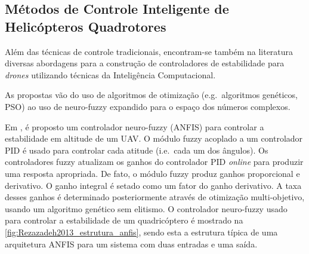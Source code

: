 \subsection{Métodos de Controle Inteligente de Helicópteros Quadrotores}
\label{sec:trab-rel-quadrotores-sub-ia}

Além das técnicas de controle tradicionais, encontram-se também na literatura diversas abordagens para a construção de controladores de estabilidade para \textit{drones} utilizando técnicas da Inteligência Computacional. 

As propostas vão do uso de algoritmos de otimização (e.g.\ algoritmos genéticos, PSO) ao uso de neuro-fuzzy expandido para o espaço dos números complexos.

Em \cite{Rezazadeh2013}, é proposto um controlador neuro-fuzzy (ANFIS) para controlar a estabilidade em altitude de um UAV. O módulo fuzzy acoplado a um controlador PID é usado para controlar cada atitude (i.e.\ cada um dos ângulos). Os controladores fuzzy atualizam os ganhos do controlador PID \textit{online} para produzir uma resposta apropriada. De fato, o módulo fuzzy produz ganhos proporcional e derivativo. O ganho integral é setado como um fator do ganho derivativo. A taxa desses ganhos é determinado posteriormente através de otimização multi-objetivo, usando um algoritmo genético sem elitismo. O controlador neuro-fuzzy usado para controlar a estabilidade de um quadricóptero é mostrado na \autoref{fig:Rezazadeh2013_estrutura_anfis}, sendo esta a estrutura típica de uma arquitetura ANFIS para um sistema com duas entradas e uma saída.

